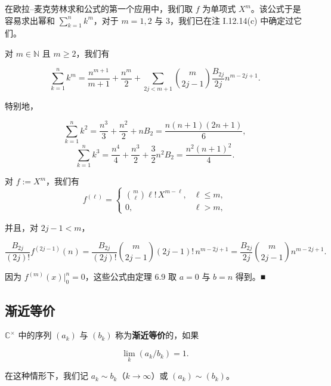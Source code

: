 在欧拉–麦克劳林求和公式的第一个应用中，我们取 $ f $ 为单项式 $ X^m $。该公式于是容易求出幂和 $ \sum_{k=1}^{n} k^m $，对于 $ m = 1, 2 $ 与 3，我们已在注 I.12.14(c) 中确定过它们。

\begin{example}

对 $ m \in \mathbb{N} $ 且 $ m \ge 2 $，我们有

\[
\sum_{k=1}^{n} k^m = \frac{n^{m+1}}{m+1} + \frac{n^m}{2} + \sum_{2j < m+1}\binom{m}{2j-1}\frac{B_{2j}}{2j}n^{m-2j+1} .
\]

特别地，

\[
\sum_{k=1}^{n} k^2 = \frac{n^3}{3} + \frac{n^2}{2} + nB_2 = \frac{n(n+1)(2n+1)}{6} ,
\]
\[
\sum_{k=1}^{n} k^3 = \frac{n^4}{4} + \frac{n^3}{2} + \frac{3}{2}n^2 B_2 = \frac{n^2(n+1)^2}{4} .
\]

\proofhead
对 $ f := X^m $，我们有
\begin{equation*}
f^{(\ell)} = \begin{cases} \binom{m}{\ell}\ell!\,X^{m-\ell} , & \ell \le m , \\ 0 , & \ell > m , \end{cases}
\end{equation*}

并且，对 $ 2j - 1 < m $，

\[
\frac{B_{2j}}{(2j)!}f^{(2j-1)}(n) = \frac{B_{2j}}{(2j)!}\binom{m}{2j-1}(2j-1)!\,n^{m-2j+1} = \frac{B_{2j}}{2j}\binom{m}{2j-1}n^{m-2j+1} .
\]

因为 $ f^{(m)}(x)\big|_0^n = 0 $，这些公式由定理 6.9 取 $ a = 0 $ 与 $ b = n $ 得到。\nobreak\hspace{0.35em}■

\end{example}

\subsection*{渐近等价}

$ \mathbb{C}^\times $ 中的序列 $ (a_k) $ 与 $ (b_k) $ 称为\textbf{渐近等价}的，如果

\[
\lim_{k}(a_k/b_k) = 1 .
\]

在这种情形下，我们记 $ a_k \sim b_k $（$ k \to \infty $）或 $ (a_k) \sim (b_k) $。

